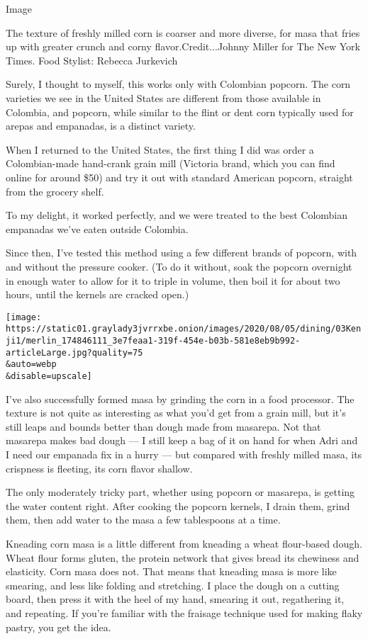 Image

The texture of freshly milled corn is coarser and more diverse, for masa
that fries up with greater crunch and corny flavor.Credit...Johnny
Miller for The New York Times. Food Stylist: Rebecca Jurkevich

Surely, I thought to myself, this works only with Colombian popcorn. The
corn varieties we see in the United States are different from those
available in Colombia, and popcorn, while similar to the flint or dent
corn typically used for arepas and empanadas, is a distinct variety.

When I returned to the United States, the first thing I did was order a
Colombian-made hand-crank grain mill (Victoria brand, which you can find
online for around \$50) and try it out with standard American popcorn,
straight from the grocery shelf.

To my delight, it worked perfectly, and we were treated to the best
Colombian empanadas we've eaten outside Colombia.

Since then, I've tested this method using a few different brands of
popcorn, with and without the pressure cooker. (To do it without, soak
the popcorn overnight in enough water to allow for it to triple in
volume, then boil it for about two hours, until the kernels are cracked
open.)

\texttt{[image: https://static01.graylady3jvrrxbe.onion/images/2020/08/05/dining/03Kenji1/merlin\_174846111\_3e7feaa1-319f-454e-b03b-581e8eb9b992-articleLarge.jpg?quality=75\\\&auto=webp\\\&disable=upscale]}

I've also successfully formed masa by grinding the corn in a food
processor. The texture is not quite as interesting as what you'd get
from a grain mill, but it's still leaps and bounds better than dough
made from masarepa. Not that masarepa makes bad dough --- I still keep a
bag of it on hand for when Adri and I need our empanada fix in a hurry
--- but compared with freshly milled masa, its crispness is fleeting,
its corn flavor shallow.

The only moderately tricky part, whether using popcorn or masarepa, is
getting the water content right. After cooking the popcorn kernels, I
drain them, grind them, then add water to the masa a few tablespoons at
a time.

Kneading corn masa is a little different from kneading a wheat
flour-based dough. Wheat flour forms gluten, the protein network that
gives bread its chewiness and elasticity. Corn masa does not. That means
that kneading masa is more like smearing, and less like folding and
stretching. I place the dough on a cutting board, then press it with the
heel of my hand, smearing it out, regathering it, and repeating. If
you're familiar with the fraisage technique used for making flaky
pastry, you get the idea.

